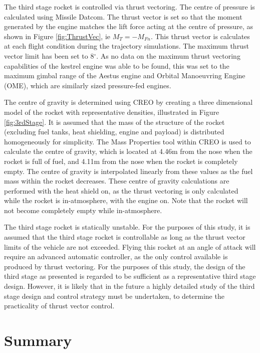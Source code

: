 		The third stage rocket is controlled via thrust vectoring. The centre of pressure is calculated using Missile Datcom. The thrust vector is set so that the moment generated by the engine matches the lift force acting at the centre of pressure, as shown in Figure \ref{fig:ThrustVec}, ie $M_{T} = -M_{Fn}$. This thrust vector is calculates at each flight condition during the trajectory simulations. The maximum thrust vector limit has been set to 8$^\circ$. As no data on the maximum thrust vectoring capabilities of the kestrel engine was able to be found, this was set to the maximum gimbal range of the Aestus engine and Orbital Manoeuvring Engine (OME), which are similarly sized pressure-fed engines\cite{Wade2017}.
		
		The centre of gravity is determined using CREO by creating a three dimensional model of the rocket with representative densities, illustrated in Figure \ref{fig:3rdStage}. It is assumed that the mass of the structure of the rocket (excluding fuel tanks, heat shielding, engine and payload) is distributed homogeneously for simplicity. The Mass Properties tool within CREO is used to calculate the centre of gravity, which is located at 4.46m from the nose when the rocket is full of fuel, and 4.11m from the nose when the rocket is completely empty. The centre of gravity is interpolated linearly from these values as the fuel mass within the rocket decreases. These centre of gravity calculations are performed with the heat shield on, as the thrust vectoring is only calculated while the rocket is in-atmosphere, with the engine on. Note that the rocket will not become completely empty while in-atmosphere. 
		
	The third stage rocket is statically unstable. For the purposes of this study, it is assumed that the third stage rocket is controllable as long as the thrust vector limits of the vehicle are not exceeded. 
		Flying this rocket at an angle of attack will require an advanced automatic controller, as the only control available is produced by thrust vectoring. For the purposes of this study, the design of the third stage as presented is regarded to be sufficient as a representative third stage design.
		However, it is likely that in the future a highly detailed study of the third stage design and control strategy must be undertaken, to determine the practicality of thrust vector control. 
		


	\section{Summary}	
	
